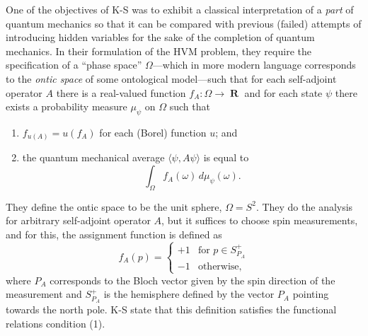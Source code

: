 \documentclass[12pt,draft]{article}
\DeclareMathOperator{\R}{\mathbf{R}}
\theoremstyle{definition}
\theoremstyle{plain}
\begin{document}
    One of the objectives of K-S was to exhibit a classical
    interpretation of a \textit{part} of quantum mechanics
    so that it can be compared with previous (failed)
    attempts of introducing hidden variables for the sake of
    the completion of quantum mechanics. In their
    formulation of the HVM problem, they require the
    specification of a ``phase space'' $\Omega$---which in
    more modern language corresponds to the \textit{ontic
    space} of some ontological model---such that for each
    self-adjoint operator $A$ there is a real-valued
    function $f_A : \Omega \to \R$ and for each state $\psi$
    there exists a probability measure  $\mu_\psi$ on
    $\Omega$ such that
    \begin{enumerate}
        \item $f_{u(A)} = u(f_A)$ for each (Borel) function
            $u$; and
        \item the quantum mechanical average $\langle \psi,
            A\psi\rangle$ is equal to
            \begin{equation}
                \int_\Omega f_A(\omega) \,
                d\mu_\psi(\omega).
            \end{equation}
    \end{enumerate}
    They define the ontic space to be the unit sphere,
    $\Omega = S^2$. They do the analysis for arbitrary
    self-adjoint operator $A$, but it suffices to choose
    spin measurements, and for this, the assignment function
    is defined as
    \begin{equation}
        f_A(p)
        = \begin{cases}
            +1 & \text{for } p \in S^{+}_{P_A} \\
            -1 & \text{otherwise,}
        \end{cases}
    \end{equation}
    where $P_A$ corresponds to the Bloch vector given by
    the spin direction of the measurement and $S^+_{P_A}$
    is the hemisphere defined by the vector $P_A$ pointing
    towards the north pole. K-S state that this definition
    satisfies the functional relations condition (1). 
\end{document}

